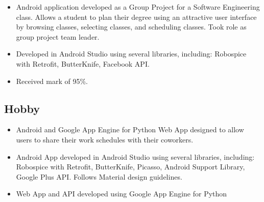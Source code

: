 \documentclass[11pt,letterpaper,sans]{moderncv}        %
\begin{document}
{
  \begin{itemize}
    \item Android application developed as a Group Project for a Software Engineering class. Allows a student to plan their degree using an attractive user interface by browsing classes, selecting classes, and scheduling classes. Took role as group project team leader.
    \item Developed in Android Studio using several libraries, including: Robospice with Retrofit, ButterKnife, Facebook API.
    \item Received mark of 95\%.
  \end{itemize}
}


\vspace*{-0.5cm} %
\subsection{Hobby}

{
  \begin{itemize}
    \item Android and Google App Engine for Python Web App designed to allow users to share their work schedules with their coworkers.
    \item Android App developed in Android Studio using several libraries, including: Robospice with Retrofit, ButterKnife, Picasso, Android Support Library, Google Plus API. Follows Material design guidelines.
    \item Web App and API developed using Google App Engine for Python
  \end{itemize}
}


\vspace*{-0.5cm} %
\end{document}
